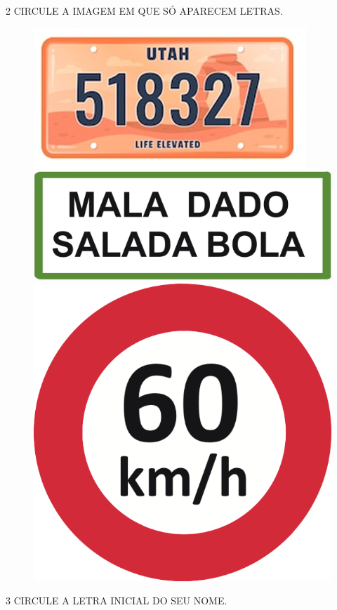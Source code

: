\num{2} CIRCULE A IMAGEM EM QUE SÓ APARECEM LETRAS. 


\begin{figure}[H]
\centering
\includegraphics[width=.9\textwidth]{media/image2.png}

\vspace{0.5cm}

\includegraphics[width=.9\textwidth]{media/image3.png}

\vspace{0.5cm}

\includegraphics[width=.5\textwidth]{media/image4.png}
\end{figure}

\num{3} CIRCULE A LETRA INICIAL DO SEU NOME. 

